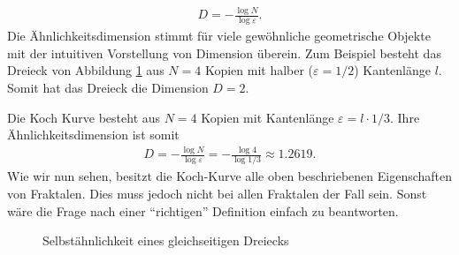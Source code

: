 \begin{align*}
	D = - \frac{\log N}{\log \varepsilon }.
\end{align*}
Die Ähnlichkeitsdimension stimmt für viele gewöhnliche geometrische Objekte mit der intuitiven Vorstellung von Dimension überein.
Zum Beispiel besteht das Dreieck
von Abbildung \ref{ifs:trinagle}
aus $N = 4$ Kopien mit halber ($\varepsilon = 1/2$) Kantenlänge $l$.
Somit hat das Dreieck die Dimension $D = 2$.

Die Koch Kurve besteht aus $N = 4$ Kopien mit Kantenlänge $\varepsilon =l \cdot 1/3$.
Ihre  Ähnlichkeitsdimension ist somit
\begin{align*}
	D = - \frac{\log N }{\log \varepsilon } = - \frac{\log 4 }{\log 1/3 } \approx 1.2619.
\end{align*}
Wie wir nun sehen, besitzt die Koch-Kurve alle oben beschriebenen Eigenschaften von Fraktalen. 
Dies muss jedoch nicht bei allen Fraktalen der Fall sein. Sonst wäre die Frage nach einer ``richtigen'' Definition einfach zu beantworten.
\begin{figure}
	\centering
	\caption{Selbstähnlichkeit eines gleichseitigen Dreiecks}
	\label{ifs:trinagle}
\end{figure}

